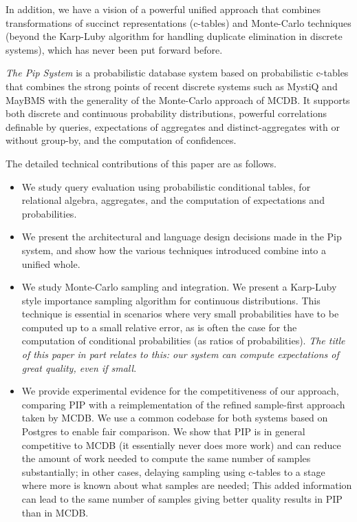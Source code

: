 In addition,  we have a  vision of  a
powerful  unified approach that  combines transformations  of succinct
representations (c-tables)  and Monte-Carlo techniques (beyond
the Karp-Luby algorithm for handling duplicate elimination in
discrete systems), which has never been put forward before.




{\em The Pip System}\/ is a probabilistic database system
based on probabilistic c-tables that combines the strong points of
recent discrete systems such as MystiQ and MayBMS with the generality of
the Monte-Carlo approach of MCDB. It supports both discrete and
continuous probability distributions, powerful correlations definable
by queries, expectations of aggregates and distinct-aggregates with or
without  group-by,  and the computation of confidences.

The detailed technical contributions of this paper are as follows.
\begin{itemize}
\addtolength{\topsep}{-0.3ex}
\addtolength{\labelsep}{-0.3ex}
\addtolength{\itemsep}{-1ex}
\item
We study query evaluation using probabilistic conditional tables, for
relational algebra, aggregates, and the computation of expectations and
probabilities.

\item
We present the architectural and language design decisions made in the
Pip system, and show how the various techniques introduced combine into
a unified whole.

\item
We study Monte-Carlo sampling and integration.
We present a Karp-Luby style importance
sampling algorithm for continuous distributions.
This technique is essential
in scenarios where very small probabilities have to be computed up to a small
relative error, as is often the case for the computation of conditional
probabilities (as ratios of probabilities).
{\em The title of this
paper in part relates to this: our system can compute expectations of 
great quality, even if small}.

\item
We provide experimental evidence for the competitiveness
of our approach, comparing PIP with a reimplementation of the
refined sample-first approach taken by MCDB. 
We use a common codebase for both systems based on Postgres to enable
fair comparison. We show that PIP is in general competitive to MCDB (it essentially never does more work) and can reduce the amount of work needed to compute the same number of samples substantially; in other cases, delaying sampling using c-tables to a stage where more is known about what samples are needed;
This added information can lead to the same number of samples giving better quality results in
PIP than in MCDB.
\end{itemize}


